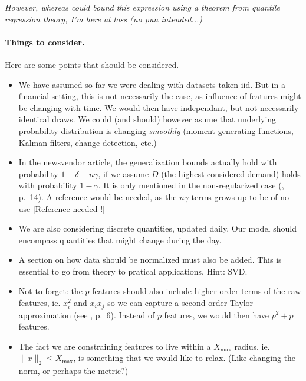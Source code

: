 \textit{However, whereas \cite{rudin2015} could bound this expression using a theorem from
  quantile regression theory, I'm here at loss (no pun intended...)}





\paragraph{Things to consider.}

Here are some points that should be considered.

\begin{itemize}
\item We have assumed so far we were dealing with datasets taken iid. But in a financial
  setting, this is not necessarily the case, as influence of features might be changing
  with time. We would then have independant, but not necessarily identical draws. We could
  (and should) however asume that underlying probability distribution is changing
  \textsl{smoothly} (moment-generating functions, Kalman filters, change detection, etc.)
\item In the newsvendor article, the generalization bounds actually hold with probability
  $1-\delta - n\gamma$, if we assume $\bar D$ (the highest considered demand) holds with
  probability $1-\gamma$. It is only mentioned in the non-regularized case
  (\cite{rudin2015}, p.~14). A reference would be needed, as the $n\gamma$ terms grows up
  to be of no use [Reference needed !]
\item We are also considering discrete quantities, updated daily. Our model should
  encompass quantities that might change during the day.
\item A section on how data should be normalized must also be added. This is essential to
  go from theory to pratical applications. Hint: SVD.
\item Not to forget: the $p$ features should also include higher order terms of the raw
  features, ie. $x_i^2$ and $x_ix_j$ so we can capture a second order Taylor approximation
  (see \cite{rudin2015}, p.~6). Instead of $p$ features, we would then have $p^2+p$
  features. 
\item The fact we are constraining features to live within a $X_{\max}{}$ radius, ie.
  $\|x\|_2\leq X_{\max}$, is something that we would like to relax. (Like changing the norm,
  or perhaps the metric?)
\end{itemize}

